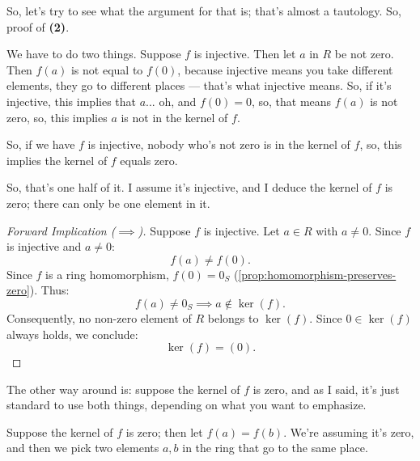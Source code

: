 \begin{proofWrapper}

\begin{speech}[00:24:34 - 00:25:38]
So, let's try to see what the argument for that is; that's almost a tautology. So, proof of \textbf{(2)}. 

We have to do two things. Suppose $f$ is injective.  Then let $a$ in $R$ be not zero.  Then $f(a)$ is not equal to $f(0)$, because injective means you take different elements, they go to different places --- that's what injective means. So, if it's injective, this implies that $a$... oh, and $f(0) = 0$, so, that means $f(a)$ is not zero,  so, this implies $a$ is not in the kernel of $f$.  

So, if we have $f$ is injective, nobody who's not zero is in the kernel of $f$, so, this implies the kernel of $f$ equals zero. 

So, that's one half of it. I assume it's injective, and I deduce the kernel of $f$ is zero; there can only be one element in it.
\end{speech}

\begin{content}
\begin{proof}[Forward Implication ($\implies$)]
Suppose $f$ is injective. Let $a \in R$ with $a \neq 0$.
Since $f$ is injective and $a \neq 0$:
\[
f(a) \neq f(0).
\]
Since $f$ is a ring homomorphism, $f(0) = 0_S$ (\cref{prop:homomorphism-preserves-zero}). Thus:
\[
f(a) \neq 0_S \implies a \notin \ker(f).
\]
Consequently, no non-zero element of $R$ belongs to $\ker(f)$. Since $0 \in \ker(f)$ always holds, we conclude:
\[
\ker(f) = (0).
\]
\end{proof}
\end{content}

\begin{speech}[00:25:38 - 00:26:43]
The other way around is: suppose the kernel of $f$ is zero,  and as I said, it's just standard to use both things, depending on what you want to emphasize. 

Suppose the kernel of $f$ is zero; then let $f(a) = f(b)$.  We're assuming it's zero, and then we pick two elements $a, b$ in the ring that go to the same place. 


\end{speech}
\end{proofWrapper}
